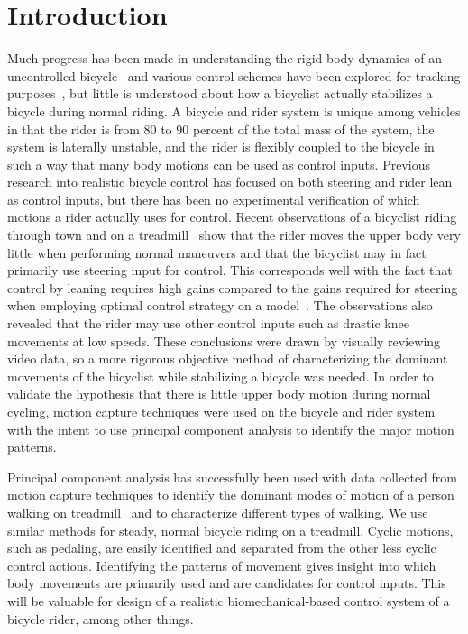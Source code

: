 \section{Introduction}
\label{intro}
Much progress has been made in understanding the rigid body dynamics of an
uncontrolled bicycle~\cite{Meijaard2007} and various control schemes have been
explored for tracking purposes~\cite{Peterson2008a,Schwab2008,Sharp2008a}, but
little is understood about how a bicyclist actually stabilizes a bicycle during
normal riding. A bicycle and rider system is unique among vehicles in
that the rider is from 80 to 90 percent of the total mass of the system, the
system is laterally unstable, and the rider is flexibly coupled to the
bicycle in such a way that many body motions can be used as control inputs.
Previous research into realistic bicycle control has focused on both steering
and rider lean as control inputs, but there has been no experimental
verification of which motions a rider actually uses for control. Recent
observations of a bicyclist riding through town and on a
treadmill~\cite{Kooijman2009a} show that the rider moves the upper body very
little when performing normal maneuvers and that the bicyclist may in fact
primarily use steering input for control. This corresponds well with the fact
that control by leaning requires high gains compared to the gains required for
steering when employing optimal control strategy on a
model~\cite{Peterson2008a,Schwab2008,Sharp2008a}. The observations also
revealed
that the rider may use other control inputs such as drastic knee movements at
low speeds. These conclusions were drawn by visually reviewing video data, so a
more rigorous objective method of characterizing the dominant movements of the
bicyclist while stabilizing a bicycle was needed. In order to validate the
hypothesis that there is little upper body motion during normal cycling, motion
capture techniques were used on the bicycle and rider system with the intent to
use principal component analysis to identify the major motion patterns.

Principal component analysis has successfully been used with data collected
from motion capture techniques to identify the dominant modes of motion of a
person walking on treadmill~\cite{Troje2002} and to characterize different
types of walking. We use similar methods for steady, normal bicycle riding on a
treadmill. Cyclic motions, such as pedaling, are easily identified and
separated from the other less cyclic control actions. Identifying the patterns
of movement gives insight into which body movements are primarily used and are
candidates for control inputs. This will be valuable for design of a realistic
biomechanical-based control system of a bicycle rider, among other things.
